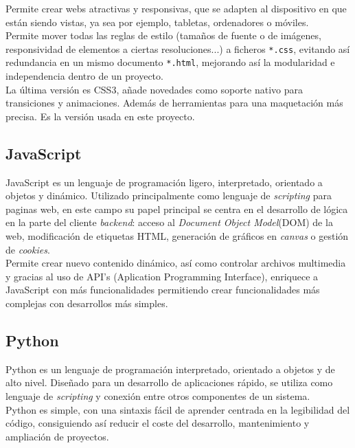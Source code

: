 \documentclass[a4paper, 12pt]{book}
\begin{document}
		Permite crear webs atractivas y responsivas, que se adapten al dispositivo en que están siendo vistas, ya sea por ejemplo, tabletas, ordenadores o móviles.\\
		
		Permite mover todas las reglas de estilo (tamaños de fuente o de imágenes, responsividad de elementos a ciertas resoluciones...) a ficheros \texttt{*.css}, evitando así redundancia en un mismo documento \texttt{*.html}, mejorando así la modularidad e independencia dentro de un proyecto.\\
		
		La última versión es CSS3, añade novedades como soporte nativo para transiciones y animaciones. Además de herramientas para una maquetación más precisa. Es la versión usada en este proyecto.
		
	\subsection{JavaScript}
	\label{subsec:javascript}
		JavaScript \cite{JavaScript} es un lenguaje de programación ligero, interpretado, orientado a objetos y dinámico. Utilizado principalmente como lenguaje de \textit{scripting} para paginas web, en este campo su papel principal se centra en el desarrollo de lógica en la parte del cliente \textit{backend}: acceso al \textit{Document Object Model}(DOM) de la web, modificación de etiquetas HTML, generación de gráficos en \textit{canvas} o gestión de \textit{cookies}. \\
		
		Permite crear nuevo contenido dinámico, así como controlar archivos multimedia y gracias al uso de API's (Aplication Programming Interface), enriquece a JavaScript con más funcionalidades permitiendo crear funcionalidades más complejas con desarrollos más simples.
		
	\subsection{Python}
	\label{subsec:python}
		Python es un lenguaje de programación interpretado, orientado a objetos y de alto nivel. Diseñado para un desarrollo de aplicaciones rápido, se utiliza como lenguaje de \textit{scripting} y conexión entre otros componentes de un sistema.\\
		
		Python es simple, con una sintaxis fácil de aprender centrada en la legibilidad del código, consiguiendo así reducir el coste del desarrollo, mantenimiento y ampliación de proyectos.\\
		
\end{document}
